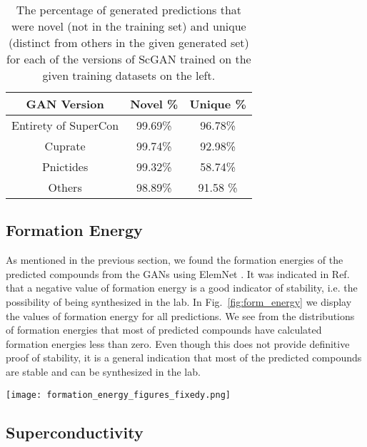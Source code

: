\begin{table}
    \centering
    \begin{ruledtabular}
    \begin{tabular}{ccc}
        GAN Version & Novel \% & Unique \%\\
        \hline
        Entirety of SuperCon & 99.69\% & 96.78\% \\
        Cuprate  & 99.74\% &  92.98\%\\
        Pnictides  & 99.32\% & 58.74\% \\
        Others &  98.89\% & 91.58 \%
    \end{tabular}
    \end{ruledtabular}
    
    \caption{The percentage of generated predictions that were novel (not in the training set) and  unique (distinct from others in the given generated set) for each of the versions of ScGAN trained on the given training datasets on the left.}
    \label{tab:novelty}
\end{table}

\subsection{Formation Energy}

As mentioned in the previous section, we found the formation energies of the predicted compounds from the GANs using ElemNet \cite{Jha2018}.
It was indicated in Ref.~\cite{Jha2018} that a negative value of formation energy is a good indicator of stability, i.e. the possibility of being 
synthesized in the lab. In Fig.~\ref{fig:form_energy} we display the values of formation energy for all predictions. We see from the 
distributions of formation energies that most of predicted compounds have calculated formation energies less than zero. Even though this does not provide definitive proof of stability, it is a general indication that most of the predicted compounds are stable and 
can be synthesized in the lab.

\begin{figure*}
    \centering
    \texttt{[image: formation\_energy\_figures\_fixedy.png]}
    \caption{Distribution of the formation energies of the predicted compounds from the four versions of the GAN: (a) everything, (b) others, (c) cuprates, (d) pnictides.}
    \label{fig:form_energy}
\end{figure*}

\subsection{Superconductivity}

